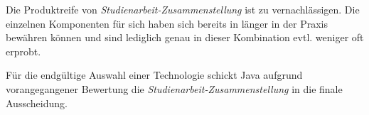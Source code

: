 Die Produktreife von \emph{Studienarbeit-Zusammenstellung} ist zu vernachlässigen. Die einzelnen Komponenten für sich haben sich bereits in länger in der Praxis bewähren können und sind lediglich genau in dieser Kombination evtl. weniger oft erprobt.

Für die endgültige Auswahl einer Technologie schickt Java aufgrund vorangegangener Bewertung die \emph{Studienarbeit-Zusammenstellung} in die finale Ausscheidung.